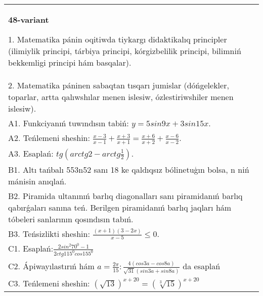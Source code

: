 \documentclass{article}
\begin{document}
\begin{tabular}{m{17cm}}
\textbf{48-variant}

1. Matematika pánin oqitiwda tiykargı didaktikalıq principler (ilimiylik principi, tárbiya principi, kórgizbelilik principi, bilimniń bekkemligi principi hám basqalar). \\
2. Matematika páninen sabaqtan tısqarı jumislar (dóńgelekler, toparlar, artta qalıwshılar menen islesiw, ózlestiriwshiler menen islesiw). \\
A1. Funkciyanıń tuwındısın tabiń: \(y = 5 sin 9x + 3 sin 15x\). \\
A2. Teńlemeni sheshin: \(\frac{x - 3}{x - 1} + \frac{x + 3}{x + 1} = \frac{x + 6}{x + 2} + \frac{x - 6}{x - 2}\). \\
A3. Esaplań: \(tg\left(arctg2 - arctg\frac{1}{2} \right) \). \\
B1. Altı tańbalı 553n52 sanı 18 ke qaldıqsız bólinetuģın bolsa, n niń mánisin anıqlań. \\
B2. Piramida ultanınıń barlıq diagonalları sanı piramidanıń barlıq qabırǵaları sanına teń. Berilgen piramidanıń barlıq jaqları hám tóbeleri sanlarının qosındısın tabıń. \\
B3. Teńsizlikti sheshin: \(\frac{ (x + 1) (3 - 2x) }{x - 5} \leq 0\). \\
C1. Esaplań:\(\frac{2sin^{2}70^{0} - 1}{2ctg115^{0}cos155^{0}}\) \\
C2. Ápiwayılastırıń hám \(a = \frac{2\pi}{15}:\frac{4 (cos3a - cos8a) }{\sqrt{31} (sin3a + sin8a) }\) da esaplań \\
C3. Teńlemeni sheshin: \((\sqrt{13}) ^{x + 20} = (\sqrt[3]{15}) ^{x + 20}\) \\

\end{tabular}
\vspace{1cm}
\end{document}

